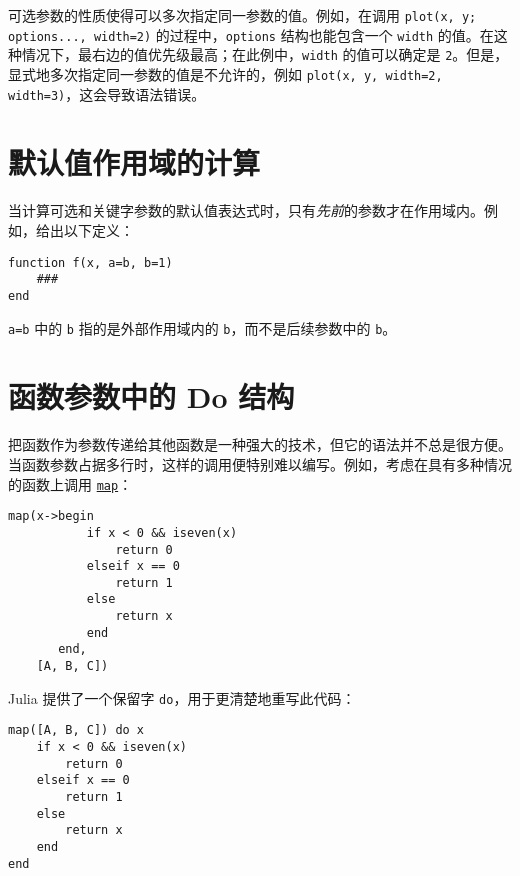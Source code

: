 可选参数的性质使得可以多次指定同一参数的值。例如，在调用 \texttt{plot(x, y; options..., width=2)} 的过程中，\texttt{options} 结构也能包含一个 \texttt{width} 的值。在这种情况下，最右边的值优先级最高；在此例中，\texttt{width} 的值可以确定是 \texttt{2}。但是，显式地多次指定同一参数的值是不允许的，例如 \texttt{plot(x, y, width=2, width=3)}，这会导致语法错误。



\hypertarget{5412457164020493169}{}


\section{默认值作用域的计算}



当计算可选和关键字参数的默认值表达式时，只有\emph{先前}的参数才在作用域内。例如，给出以下定义：




\begin{verbatim}
function f(x, a=b, b=1)
    ###
end
\end{verbatim}



\texttt{a=b} 中的 \texttt{b} 指的是外部作用域内的 \texttt{b}，而不是后续参数中的 \texttt{b}。



\hypertarget{6290715684433505788}{}


\section{函数参数中的 Do 结构}



把函数作为参数传递给其他函数是一种强大的技术，但它的语法并不总是很方便。当函数参数占据多行时，这样的调用便特别难以编写。例如，考虑在具有多种情况的函数上调用 \hyperlink{11483231213869150535}{\texttt{map}}：




\begin{verbatim}
map(x->begin
           if x < 0 && iseven(x)
               return 0
           elseif x == 0
               return 1
           else
               return x
           end
       end,
    [A, B, C])
\end{verbatim}



Julia 提供了一个保留字 \texttt{do}，用于更清楚地重写此代码：




\begin{verbatim}
map([A, B, C]) do x
    if x < 0 && iseven(x)
        return 0
    elseif x == 0
        return 1
    else
        return x
    end
end
\end{verbatim}



